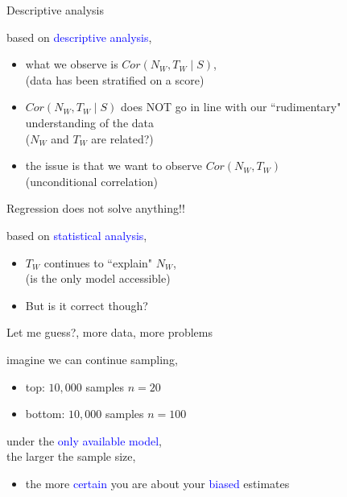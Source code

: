 %
%
\begin{lhframe}[rhgraphic={\texttt{[image: collider1\_panel2.jpg]}}]
	{Descriptive analysis}
	
	based on \textcolor{blue}{descriptive analysis},
	\begin{itemize}
		\item what we observe is $Cor(N_{W}, T_{W} \; | \; S)$, \\
		{\small (data has been stratified on a score) }
		\item $Cor(N_{W}, T_{W} \; | \; S)$ does NOT go in line with our ``rudimentary" understanding of the data\\
		{\small ($N_{W}$ and $T_{W}$ are related?)}
		\item the issue is that we want to observe $Cor(N_{W}, T_{W})$ \\
		{\small (unconditional correlation)}
	\end{itemize}
\end{lhframe}
%
%
\begin{lhframe}[rhgraphic={\texttt{[image: collider1\_reg1.png]}}]
	{Regression does not solve anything!!}
	
	based on \textcolor{blue}{statistical analysis},
	\begin{itemize}
		\item $T_{W}$ continues to ``explain" $N_{W}$, \\
		{\small (is the only model accessible)}
		\item But is it correct though?
	\end{itemize}
\end{lhframe}
%
%
\begin{lhframe}[rhgraphic={\texttt{[image: collider1\_samplesize.pdf]}}]
	{Let me guess?, more data, more problems}
	
	imagine we can continue sampling,
	\begin{itemize}
		\item top: $10,000$ samples $n=20$
		\item bottom: $10,000$ samples $n=100$
	\end{itemize}
	
	under the \textcolor{blue}{only available model}, \\
	the larger the sample size,
	\begin{itemize}
		\item the more \textcolor{blue}{certain} you are about your \textcolor{blue}{biased} estimates
	\end{itemize}
\end{lhframe}
